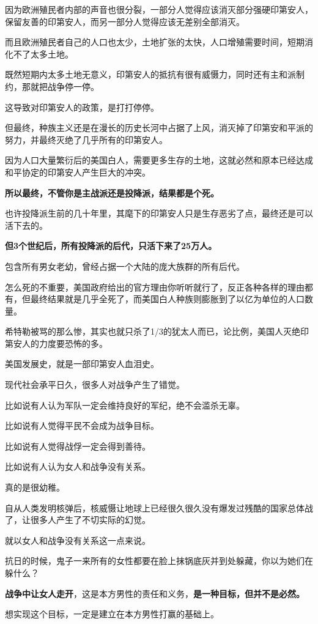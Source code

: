 \documentclass[UTF8, 11pt, oneside]{ctexart}
\newcommand{\zd}[1]{\textbf{\textcolor[RGB]{123,12,0}{#1}}} %
\begin{document}
因为欧洲殖民者内部的声音也很分裂，一部分人觉得应该消灭部分强硬印第安人，保留友善的印第安人，而另一部分人觉得应该无差别全部消灭。

而且欧洲殖民者自己的人口也太少，土地扩张的太快，人口增殖需要时间，短期消化不了太多土地。

既然短期内太多土地无意义，印第安人的抵抗有很有威慑力，同时还有主和派制约，那就把战争停一停。

这导致对印第安人的政策，是打打停停。

但最终，种族主义还是在漫长的历史长河中占据了上风，消灭掉了印第安和平派的努力，并最终灭绝了几乎所有的印第安人。

因为人口大量繁衍后的美国白人，需要更多生存的土地，这就必然和原本已经达成和平协定的印第安人产生巨大的冲突。

\zd{所以最终，不管你是主战派还是投降派，结果都是个死。}

也许投降派生前的几十年里，其麾下的印第安人只是生存恶劣了点，最终还是可以活下去的。

\zd{但3个世纪后，所有投降派的后代，只活下来了25万人。}

包含所有男女老幼，曾经占据一个大陆的庞大族群的所有后代。

怎么死的不重要，美国政府给出的官方理由你听听就行了，反正各种各样的理由都有，但最终结果就是几乎全死了，而美国白人种族则膨胀到了以亿为单位的人口数量。

希特勒被骂的那么惨，其实也就只杀了1/3的犹太人而已，论比例，美国人灭绝印第安人的力度要恐怖的多。

美国发展史，就是一部印第安人血泪史。

现代社会承平日久，很多人对战争产生了错觉。

比如说有人认为军队一定会维持良好的军纪，绝不会滥杀无辜。

比如说有人觉得平民不会成为战争目标。

比如说有人觉得战俘一定会得到善待。

比如说有人认为女人和战争没有关系。

真的是很幼稚。

自从人类发明核弹后，核威慑让地球上已经很久很久没有爆发过残酷的国家总体战了，让很多人产生了不切实际的幻觉。

就以女人和战争没有关系这一点来说。

抗日的时候，鬼子一来所有的女性都要在脸上抹锅底灰并到处躲藏，你以为她们在躲什么？

\zd{战争中让女人走开}，这是本方男性的责任和义务，\zd{是一种目标，但并不是必然。}

想实现这个目标，一定是建立在本方男性打赢的基础上。
\end{document}
